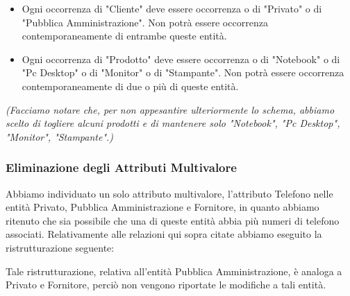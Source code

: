 \begin{itemize}
  \item Ogni occorrenza di "Cliente" deve essere occorrenza o di "Privato" o di "Pubblica Amministrazione". Non potrà essere occorrenza contemporaneamente di entrambe queste entità.
  \item Ogni occorrenza di "Prodotto" deve essere occorrenza o di "Notebook" o di "Pc Desktop" o di "Monitor" o di "Stampante". Non potrà essere occorrenza contemporaneamente di due o più di queste entità.
\end{itemize}
\noindent
\textit{(Facciamo notare che, per non appesantire ulteriormente lo schema, abbiamo scelto di togliere alcuni prodotti e di mantenere solo "Notebook", "Pc Desktop", "Monitor", "Stampante".)}



\newpage
\begin{landscape} %



\end{landscape}


\newpage
\subsubsection{Eliminazione degli Attributi Multivalore}

Abbiamo individuato un solo attributo multivalore, l'attributo Telefono nelle entità Privato, Pubblica Amministrazione e Fornitore, in quanto abbiamo ritenuto che sia possibile che una di queste entità abbia più numeri di telefono associati.
\newline
Relativamente alle relazioni qui sopra citate abbiamo eseguito la ristrutturazione seguente:
\newline\newline

\noindent{}
\newline\newline
Tale ristrutturazione, relativa all'entità Pubblica Amministrazione, è analoga a Privato e Fornitore, perciò non vengono riportate le modifiche a tali entità.
